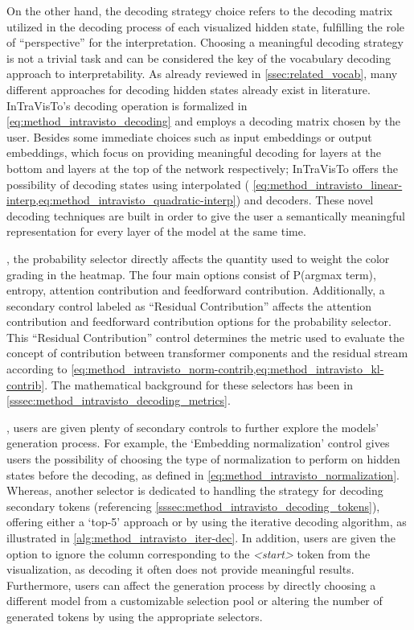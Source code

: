 On the other hand, the decoding strategy choice refers to the decoding matrix utilized in the decoding process of each visualized hidden state, fulfilling the role of ``perspective'' for the interpretation.
Choosing a meaningful decoding strategy is not a trivial task and can be considered the key  of the vocabulary decoding approach to interpretability.
As already reviewed in \cref{ssec:related_vocab}, many different approaches for decoding hidden states already exist in literature.
InTraVisTo's decoding operation is formalized in \cref{eq:method_intravisto_decoding} and employs a decoding matrix chosen by the user.
Besides some immediate choices such as input embeddings or output embeddings, which focus on providing meaningful decoding for layers at the bottom and layers at the top of the network respectively; InTraVisTo offers the possibility of decoding states using interpolated ( \cref{eq:method_intravisto_linear-interp,eq:method_intravisto_quadratic-interp}) and  decoders.
These novel decoding techniques are built in order to give the user a semantically meaningful representation for every layer of the model at the same time.

, the probability selector directly affects the quantity used to weight the color grading in the heatmap.
The four main options consist of P(argmax term), entropy, attention contribution and feedforward contribution.
Additionally, a secondary control labeled as ``Residual Contribution'' affects the attention contribution and feedforward contribution options for the probability selector.
This ``Residual Contribution'' control determines the metric used to evaluate the concept of contribution between transformer components and the residual stream according to \cref{eq:method_intravisto_norm-contrib,eq:method_intravisto_kl-contrib}.
The mathematical background for these selectors has been  in \cref{sssec:method_intravisto_decoding_metrics}.

, users are given plenty of secondary controls to further explore the models' generation process.
For example, the `Embedding normalization' control gives users the possibility of choosing the type of normalization to perform on hidden states before the decoding, as defined in \cref{eq:method_intravisto_normalization}.
Whereas, another selector is dedicated to handling the strategy for decoding secondary tokens (referencing \cref{sssec:method_intravisto_decoding_tokens}), offering either a `top-5' approach or by using the iterative decoding algorithm, as illustrated in \cref{alg:method_intravisto_iter-dec}.
In addition, users are given the option to ignore the column corresponding to the \textit{<start>} token from the visualization, as decoding it often does not provide meaningful results.
Furthermore, users can affect the generation process by directly choosing a different model from a customizable selection pool or altering the number of generated tokens by using the appropriate selectors.

